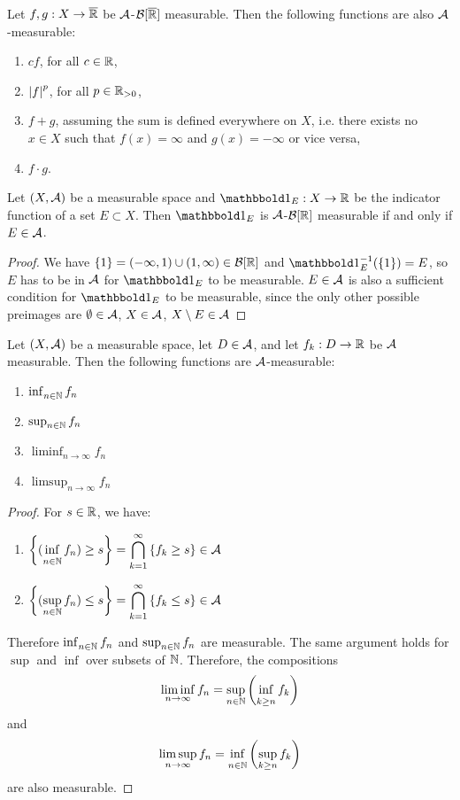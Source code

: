 \begin{theorem}
	Let $f,g : X \to \overline{{\mathbb{R}}}$ be $\mathcal{A}$-$\mathcal{B}[\overline{{\mathbb{R}}}]$ measurable. Then the following functions are also $\mathcal{A}$-measurable:
	\begin{enumerate}
		\item $cf$, for all $c \in \mathbb{R}$,
		\item $\abs{f}^p$, for all $p \in \mathbb{R}_{> 0}$,
		\item $f + g$, assuming the sum is defined everywhere on $X$, i.e. there exists no $x \in X$ such that $f(x) =\infty$ and $g(x) = -\infty$ or vice versa,
		\item $f \cdot g$.
	\end{enumerate}
\end{theorem}
\begin{theorem}
	Let $(X, \mathcal{A})$ be a measurable space and $\boldone_E : X \to \bR$ be the indicator function of a set $E \subset X$. Then $\boldone_E$ is $\mathcal{A}$-$\mathcal{B}[\mathbb{R}]$ measurable if and only if $E \in \mathcal{A}$.
\end{theorem}
\begin{proof}
	We have $\qty{1} = (-\infty,1) \cup (1, \infty) \in \mathcal{B}[\mathbb{R}]$ and $\boldone_E^{-1}(\lr{1}) = E$, so $E$ has to be in $\mathcal{A}$ for $\boldone_E$ to be measurable.
	\newpar
	$E \in \mathcal{A}$ is also a sufficient condition for $\boldone_E$ to be measurable, since the only other possible preimages are $\emptyset \in \mathcal{A}$, $X \in \mathcal{A}$, $X \setminus E \in \mathcal{A}$
\end{proof}
\begin{theorem}
	Let $(X, \mathcal{A})$ be a measurable space, let $D \in \mathcal{A}$, and let $f_k : D \to \mathbb{R}$ be $\mathcal{A}$ measurable. Then the following functions are $\mathcal{A}$-measurable:
	\begin{enumerate}
		\item $\inf_{n \in \bN} f_n$
		\item $\sup_{n \in \mathbb{N}} f_n$
		\item $\liminf_{n \to \infty} f_n$
		\item $\limsup_{n \to \infty} f_n$
	\end{enumerate}
\end{theorem}
\begin{proof}
	For $s \in \mathbb{R}$, we have:
	\begin{enumerate}
		\item $\displaystyle \lr{(\inf_{n \in \bN} f_n) \geq s} = \bigcap_{k = 1}^\infty \lr{f_k \geq s} \in \cA$
		\item $\displaystyle \qty{(\sup_{n \in \mathbb{N}} f_n) \leq s} = \bigcap_{k = 1}^\infty \qty{f_k \leq s} \in \mathcal{A}$
	\end{enumerate}
	Therefore $\inf_{n \in \bN} f_n$ and $\sup_{n \in \mathbb{N}} f_n$ are measurable. The same argument holds for $\sup$ and $\inf$ over subsets of $\mathbb{N}$. Therefore, the compositions
	\begin{align*}
		\liminf_{n \to \infty} f_n = \sup_{n \in \bN} \lr(\inf_{k \geq n} f_k)
	\end{align*}
	and
	\begin{align*}
		\limsup_{n \to \infty} f_n = \inf_{n \in \bN} 	\lr(\sup_{k \geq n} f_k)
	\end{align*}
	are also measurable.
\end{proof}
